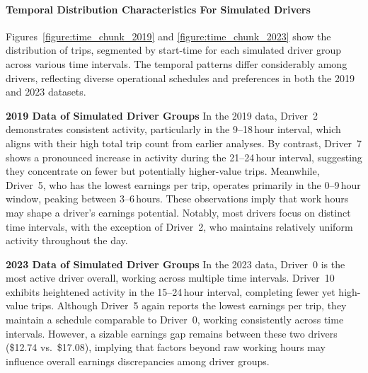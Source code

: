 \paragraph{Temporal Distribution Characteristics For Simulated Drivers}
Figures~\ref{figure:time_chunk_2019} and \ref{figure:time_chunk_2023} show the distribution of trips, segmented by start-time for each simulated driver group across various time intervals. The temporal patterns differ considerably among drivers, reflecting diverse operational schedules and preferences in both the 2019 and 2023 datasets.


\textbf{2019 Data of Simulated Driver Groups}  
In the 2019 data, Driver~2 demonstrates consistent activity, particularly in the 9--18\,hour interval, which aligns with their high total trip count from earlier analyses. By contrast, Driver~7 shows a pronounced increase in activity during the 21--24\,hour interval, suggesting they concentrate on fewer but potentially higher-value trips. Meanwhile, Driver~5, who has the lowest earnings per trip, operates primarily in the 0--9\,hour window, peaking between 3--6\,hours. These observations imply that work hours may shape a driver's earnings potential. Notably, most drivers focus on distinct time intervals, with the exception of Driver~2, who maintains relatively uniform activity throughout the day.

\textbf{2023 Data of Simulated Driver Groups}  
In the 2023 data, Driver~0 is the most active driver overall, working across multiple time intervals. Driver~10 exhibits heightened activity in the 15--24\,hour interval, completing fewer yet high-value trips. Although Driver~5 again reports the lowest earnings per trip, they maintain a schedule comparable to Driver~0, working consistently across time intervals. However, a sizable earnings gap remains between these two drivers (\$12.74 vs.~\$17.08), implying that factors beyond raw working hours may influence overall earnings discrepancies among driver groups.

